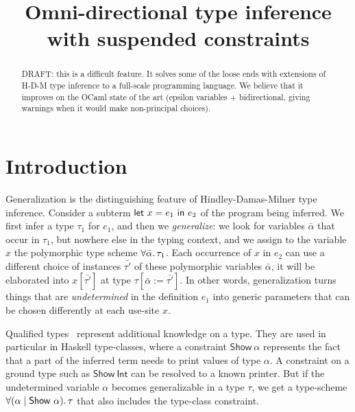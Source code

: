 \documentclass[acmsmall,screen,nonacm]{acmart}
\begin{document}
\title{Omni-directional type inference with suspended constraints}

\begin{abstract}
  DRAFT: this is a difficult feature. It solves some of the loose ends
  with extensions of H-D-M type inference to a full-scale programming
  language. We believe that it improves on the OCaml state of the art
  (epsilon variables + bidirectional, giving warnings when it would
  make non-principal choices).
\end{abstract}


\maketitle

\section{Introduction}

Generalization is the distinguishing feature of Hindley-Damas-Milner type inference. Consider a subterm $\mathsf{let} ~ x = e_1 ~ \mathsf{in} ~ e_2$ of the program being inferred. We first infer a type $\tau_1$ for $e_1$, and then we \emph{generalize}: we look for variables $\bar{\alpha}$ that occur in $\tau_1$, but nowhere else in the typing context, and we assign to the variable $x$ the polymorphic type scheme $\forall {\bar{\alpha}}.\,{\tau_1}$. Each occurrence of $x$ in $e_2$ can use a different choice of instances $\bar{\tau'}$ of these polymorphic variables $\bar{\alpha}$, it will be elaborated into $x [\bar{\tau'}]$ at type $\tau[\bar{\alpha} := \bar{\tau'}]$. In other words, generalization turns things that are \emph{undetermined} in the definition $e_1$ into generic parameters that can be chosen differently at each use-site $x$.

Qualified types~\citep*{TODO} represent additional knowledge on a type. They are used in particular in Haskell type-classes, where a constraint $\mathsf{Show}~\alpha$ represents the fact that a part of the inferred term needs to print values of type $\alpha$. A constraint on a ground type such as $\mathsf{Show}~\mathsf{Int}$ can be resolved to a known printer. But if the undetermined variable $\alpha$ becomes generalizable in a type $\tau$, we get a type-scheme $\forall {(\alpha \mid \mathsf{Show}~\alpha)}.\,{\tau}$ that also includes the type-class constraint.
\end{document}
